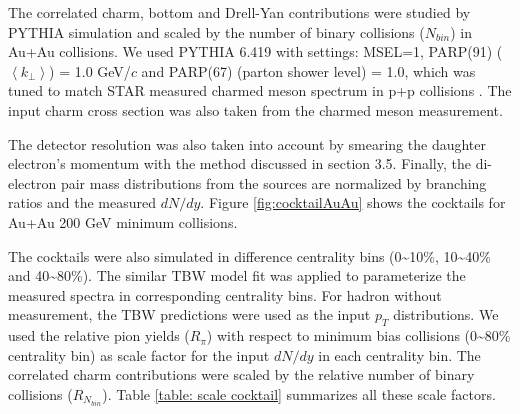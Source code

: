 The correlated charm, bottom and Drell-Yan contributions were studied
by PYTHIA simulation \cite{Torbjorn-Sjostrand:2001ek} and scaled
by the number of binary collisions ($N_{bin}$) in Au+Au collisions.
We used PYTHIA 6.419 with settings: MSEL=1, PARP(91) ($\left\langle k_{\perp}\right\rangle $)
= 1.0 GeV/$c$ and PARP(67) (parton shower level) = 1.0, which was
tuned to match STAR measured charmed meson spectrum in p+p collisions
\cite{PhysRevD.86.072013}. The input charm cross section was also
taken from the charmed meson measurement.

The detector resolution was also taken into account by smearing the
daughter electron's momentum with the method discussed in section
3.5. Finally, the di-electron pair mass distributions from the sources
are normalized by branching ratios and the measured $dN/dy$. Figure
\ref{fig:cocktailAuAu} shows the cocktails for Au+Au 200 GeV minimum
collisions.

The cocktails were also simulated in difference centrality bins (0\textasciitilde{}10\%,
10\textasciitilde{}40\% and 40\textasciitilde{}80\%). The similar
TBW model fit was applied to parameterize the measured spectra in
corresponding centrality bins. For hadron without measurement, the
TBW predictions were used as the input $p_{T}$ distributions. We
used the relative pion yields ($R_{\pi}$) with respect to minimum
bias collisions (0\textasciitilde{}80\% centrality bin) as scale factor
for the input $dN/dy$ in each centrality bin. The correlated charm
contributions were scaled by the relative number of binary collisions
($R_{N_{bin}}$). Table \ref{table: scale cocktail} summarizes all
these scale factors.

